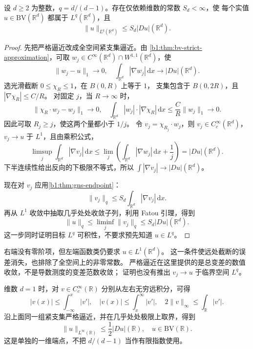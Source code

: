 \begin{theorem}\label{b1:thm:bv-sobolev-endpoint}
设 \(d\ge2\) 为整数，\(q=d/(d-1)\)。存在仅依赖维数的常数 \(S_d<\infty\)，使
每个实值 \(u\in \mathrm{BV}(\mathbb R^d)\) 都属于 \(L^q(\mathbb R^d)\)，且
\begin{equation}\label{b1:eq:bv-sobolev-endpoint}
 \|u\|_{L^q(\mathbb R^d)}\le S_d|Du|(\mathbb R^d).
\end{equation}
\end{theorem}
\begin{proof}
先把严格逼近改成全空间紧支集逼近。由%
\cref{b1:thm:bv-strict-approximation}，可取
\(w_j\in C^\infty(\mathbb R^d)\cap W^{1,1}(\mathbb R^d)\)，使
\[
 \|w_j-u\|_1\to0,\quad
 \int_{\mathbb R^d}|\nabla w_j|\,\mathrm dx
       \longrightarrow|Du|(\mathbb R^d).
\]
选光滑截断 \(0\le\chi_R\le1\)，在 \(B(0,R)\) 上等于 \(1\)，
支集包含于 \(B(0,2R)\)，且 \(|\nabla\chi_R|\le C/R\)。
对固定 \(j\)，当 \(R\to\infty\) 时，
\[
 \|\chi_R\cdot w_j-w_j\|_1\to0,\quad
 \int_{\mathbb R^d}|w_j|\cdot|\nabla\chi_R|\,\mathrm dx
       \le\frac C R\|w_j\|_1\to0.
\]
因此可取 \(R_j\ge j\)，使这两个量都小于 \(1/j\)。
令 \(v_j=\chi_{R_j}\cdot w_j\)，则 \(v_j\in C_c^\infty(\mathbb R^d)\)，
\(v_j\to u\) 于 \(L^1\)，且由乘积公式，
\[
 \limsup_j\int_{\mathbb R^d}|\nabla v_j|\,\mathrm dx
 \le\lim_j\left(\int_{\mathbb R^d}|\nabla w_j|\,\mathrm dx+\frac1j\right)
 =|Du|(\mathbb R^d).
\]
下半连续性给出反向的下极限不等式，所以
\(\int|\nabla v_j|\to|Du|(\mathbb R^d)\)。

现在对 \(v_j\) 应用\cref{b1:thm:gns-endpoint}：
\[
 \|v_j\|_q\le S_d\int_{\mathbb R^d}|\nabla v_j|\,\mathrm dx.
\]
再从 \(L^1\) 收敛中抽取几乎处处收敛子列，利用 Fatou 引理，得到
\[
 \|u\|_q
 \le\liminf_j\|v_j\|_q
 \le S_d|Du|(\mathbb R^d).
\]
这一步同时证明目标 \(L^q\) 可积性，不要求预先知道 \(u\in L^q\)。
\end{proof}

右端没有零阶项，但左端函数类仍要求 \(u\in L^1(\mathbb R^d)\)。
这一条件使远处截断的误差消失，也排除了全空间上的非零常数。
严格逼近在这里提供的是总变差的数值收敛，不是导数测度的变差范数收敛；
证明也没有推出 \(v_j\to u\) 于临界空间 \(L^q\)。

\ProseParagraphBreak

维数 \(d=1\) 时，对 \(v\in C_c^\infty(\mathbb R)\) 分别从左右无穷远积分，可得
\[
 |v(x)|\le\int_{-\infty}^x|v'|,\quad
 |v(x)|\le\int_x^\infty|v'|,
 \quad
 2\|v\|_\infty\le\int_{\mathbb R}|v'|.
\]
沿上面同一组紧支集严格逼近，并在几乎处处极限上取界，得到
\[
 \|u\|_{L^\infty(\mathbb R)}\le\frac12|Du|(\mathbb R),
 \quad u\in \mathrm{BV}(\mathbb R).
\]
这是单独的一维端点，不把 \(d/(d-1)\) 当作有限指数使用。

